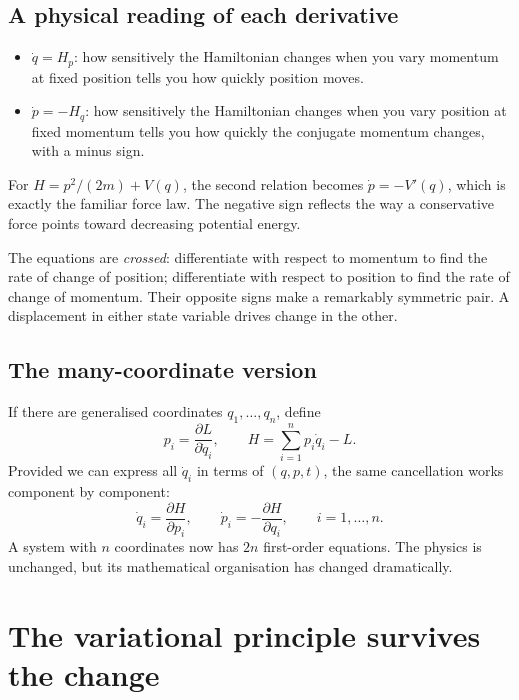 \documentclass[11pt,a4paper,oneside]{article}
\newcommand{\pd}[2]{\frac{\partial #1}{\partial #2}}
\begin{document}
\subsection{A physical reading of each derivative}
\begin{itemize}
 \item $\dot q=H_p$: how sensitively the Hamiltonian changes when you vary momentum at fixed position tells you how quickly position moves.
 \item $\dot p=-H_q$: how sensitively the Hamiltonian changes when you vary position at fixed momentum tells you how quickly the conjugate momentum changes, with a minus sign.
\end{itemize}

For $H=p^2/(2m)+V(q)$, the second relation becomes $\dot p=-V'(q)$, which is exactly the familiar force law. The negative sign reflects the way a conservative force points toward decreasing potential energy.

\begin{intuition}
The equations are \emph{crossed}: differentiate with respect to momentum to find the rate of change of position; differentiate with respect to position to find the rate of change of momentum. Their opposite signs make a remarkably symmetric pair. A displacement in either state variable drives change in the other.
\end{intuition}

\subsection{The many-coordinate version}
If there are generalised coordinates $q_1,\ldots,q_n$, define
\[
 p_i=\pd{L}{\dot q_i},\qquad
 H=\sum_{i=1}^{n}p_i\dot q_i-L.
\]
Provided we can express all $\dot q_i$ in terms of $(q,p,t)$, the same cancellation works component by component:
\begin{equation}\label{eq:many}
 \boxed{\dot q_i=\pd{H}{p_i},\qquad
        \dot p_i=-\pd{H}{q_i},\qquad i=1,\ldots,n.}
\end{equation}
A system with $n$ coordinates now has $2n$ first-order equations. The physics is unchanged, but its mathematical organisation has changed dramatically.

\section{The variational principle survives the change}
\end{document}
